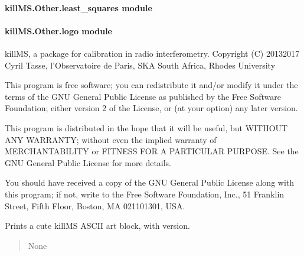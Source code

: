 \documentclass[letterpaper,10pt,english]{sphinxmanual}
\begin{document}
\paragraph{killMS.Other.least\_squares module}
\label{\detokenize{api/killMS.Other:killms-other-least-squares-module}}

\paragraph{killMS.Other.logo module}
\label{\detokenize{api/killMS.Other:module-killMS.Other.logo}}\label{\detokenize{api/killMS.Other:killms-other-logo-module}}
\sphinxAtStartPar
killMS, a package for calibration in radio interferometry.
Copyright (C) 2013\sphinxhyphen{}2017  Cyril Tasse, l’Observatoire de Paris,
SKA South Africa, Rhodes University

\sphinxAtStartPar
This program is free software; you can redistribute it and/or
modify it under the terms of the GNU General Public License
as published by the Free Software Foundation; either version 2
of the License, or (at your option) any later version.

\sphinxAtStartPar
This program is distributed in the hope that it will be useful,
but WITHOUT ANY WARRANTY; without even the implied warranty of
MERCHANTABILITY or FITNESS FOR A PARTICULAR PURPOSE.  See the
GNU General Public License for more details.

\sphinxAtStartPar
You should have received a copy of the GNU General Public License
along with this program; if not, write to the Free Software
Foundation, Inc., 51 Franklin Street, Fifth Floor, Boston, MA  02110\sphinxhyphen{}1301, USA.

\begin{fulllineitems}
\label{\detokenize{api/killMS.Other:killMS.Other.logo.print_logo}}
\pysigstartsignatures
{}
\pysigstopsignatures
\sphinxAtStartPar
Prints a cute killMS ASCII art block, with version.
\begin{quote}\begin{description}
\sphinxAtStartPar
None

\end{description}\end{quote}

\end{fulllineitems}
\end{document}
